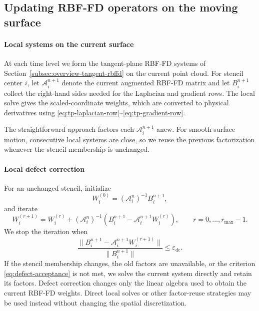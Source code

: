 \documentclass[a4paper,fleqn]{cas-sc}
\begin{document}
\subsection{Updating RBF-FD operators on the moving surface}
\label{subsec:moving-tangent-plane-stencils}

\paragraph{Local systems on the current surface}
At each time level we form the tangent-plane RBF-FD systems of
Section~\ref{subsec:overview-tangent-rbffd} on the current point cloud.  For
stencil center $i$, let $\mathcal A_i^{n+1}$ denote the current augmented
RBF-FD matrix and let $B_i^{n+1}$ collect the right-hand sides needed for the
Laplacian and gradient rows.  The local solve gives the scaled-coordinate
weights, which are converted to physical derivatives using
\eqref{eq:tp-laplacian-row}--\eqref{eq:tp-gradient-row}.

The straightforward approach factors each $\mathcal A_i^{n+1}$ anew.  For
smooth surface motion, consecutive local systems are close, so we reuse the
previous factorization whenever the stencil membership is unchanged.

\paragraph{Local defect correction}
For an unchanged stencil, initialize
\begin{equation}
  W_i^{(0)}=(\mathcal A_i^n)^{-1}B_i^{n+1},
  \label{eq:defect-initial-guess}
\end{equation}
and iterate
\begin{equation}
  W_i^{(r+1)}
  =
  W_i^{(r)}
  +(\mathcal A_i^n)^{-1}
  \left(B_i^{n+1}-\mathcal A_i^{n+1}W_i^{(r)}\right),
  \qquad r=0,\ldots,r_{\max}-1.
  \label{eq:defect-correction}
\end{equation}
We stop the iteration when
\begin{equation}
  \frac{\|B_i^{n+1}-\mathcal A_i^{n+1}W_i^{(r+1)}\|}
       {\|B_i^{n+1}\|}
  \leq \varepsilon_{\mathrm{dc}}.
  \label{eq:defect-acceptance}
\end{equation}
If the stencil membership changes, the old factors are unavailable, or the
criterion \eqref{eq:defect-acceptance} is not met, we solve the current system
directly and retain its factors.  Defect correction changes only the linear
algebra used to obtain the current RBF-FD weights.  Direct local solves or
other factor-reuse strategies may be used instead without changing the spatial
discretization.
\end{document}
